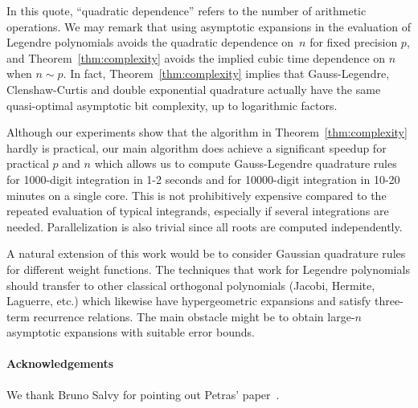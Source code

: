\documentclass{siamart0216}
\begin{document}
In this quote, ``quadratic dependence'' refers to the number of arithmetic operations.
We may remark that using asymptotic expansions in the
evaluation of Legendre polynomials avoids the quadratic
dependence on~$n$ for fixed precision $p$, and Theorem~\ref{thm:complexity}
avoids the implied cubic time dependence on $n$ when $n \sim p$.
In fact, Theorem~\ref{thm:complexity} implies that
Gauss-Legendre, Clenshaw-Curtis and double exponential
quadrature actually have the same quasi-optimal asymptotic bit complexity,
up to logarithmic factors.

Although our experiments show that the algorithm in Theorem~\ref{thm:complexity}
hardly is practical, our main algorithm does achieve a
significant speedup for practical $p$ and $n$
which allows us to compute Gauss-Legendre quadrature rules for
1000-digit integration in 1-2 seconds and for 10000-digit integration in 10-20 minutes
on a single core. This is not prohibitively
expensive compared to the repeated evaluation
of typical integrands, especially if several integrations are needed.
Parallelization is also trivial since all roots
are computed independently.

A natural extension of this work would be to
consider Gaussian quadrature rules for different
weight functions.
The techniques that work for Legendre polynomials should transfer to other
classical orthogonal polynomials (Jacobi, Hermite, Laguerre, etc.)
which likewise have hypergeometric expansions
and satisfy three-term recurrence relations.
The main obstacle might be
to obtain large-$n$ asymptotic expansions with suitable error bounds.

\paragraph*{Acknowledgements}

We thank Bruno Salvy for pointing out Petras' paper~\cite{petras1999computation}.



\end{document}
